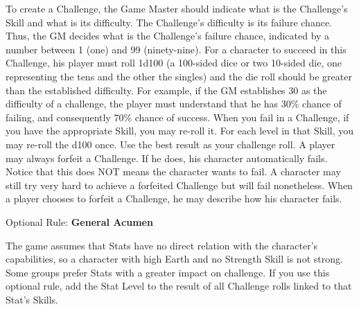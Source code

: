 \begin{multicols}{2}
To create a Challenge, the Game Master should indicate what is the Challenge’s Skill and what is its difficulty. The Challenge’s difficulty is its failure chance. Thus, the GM decides what is the Challenge’s failure chance, indicated by a number between 1 (one) and 99 (ninety-nine). For a character to succeed in this Challenge, his player must roll 1d100 (a 100-sided dice or two 10-sided die, one representing the tens and the other the singles) and the die roll should be greater than the established difficulty. For example, if the GM establishes 30 as the difficulty of a challenge, the player must understand that he has 30\% chance of failing, and consequently 70\% chance of success. When you fail in a Challenge, if you have the appropriate Skill, you may re-roll it. For each level in that Skill, you may re-roll the d100 once. Use the best result as your challenge roll. A player may always forfeit a Challenge. If he does, his character automatically fails. Notice that this does NOT means the character wants to fail. A character may still try very hard to achieve a forfeited Challenge but will fail nonetheless. When a player chooses to forfeit a Challenge, he may describe how his character fails.

\begin{boco}
Optional Rule: \textbf{General Acumen}\pc%

The game assumes that Stats have no direct relation with the character's capabilities, so a character with high Earth and no Strength Skill is not strong. Some groups prefer Stats with a greater impact on challenge. If you use this optional rule, add the Stat Level to the result of all Challenge rolls linked to that Stat's Skills.
\end{boco}
\end{multicols}
\clearpage
